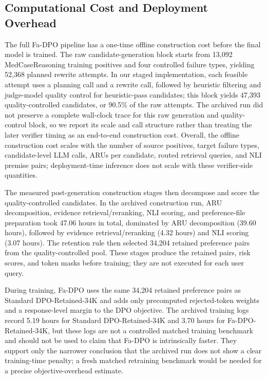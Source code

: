 \documentclass[a4paper,fleqn,doubleblind]{cas-sc}
\begin{document}
\subsection{Computational Cost and Deployment Overhead}
The full Fa-DPO pipeline has a one-time offline construction cost before the final model is trained. The raw candidate-generation block starts from 13,092 MedCaseReasoning training positives and four controlled failure types, yielding 52,368 planned rewrite attempts. In our staged implementation, each feasible attempt uses a planning call and a rewrite call, followed by heuristic filtering and judge-model quality control for heuristic-pass candidates; this block yields 47,393 quality-controlled candidates, or 90.5\% of the raw attempts. The archived run did not preserve a complete wall-clock trace for this raw generation and quality-control block, so we report its scale and call structure rather than treating the later verifier timing as an end-to-end construction cost. Overall, the offline construction cost scales with the number of source positives, target failure types, candidate-level LLM calls, ARUs per candidate, routed retrieval queries, and NLI premise pairs; deployment-time inference does not scale with these verifier-side quantities.

The measured post-generation construction stages then decompose and score the quality-controlled candidates. In the archived construction run, ARU decomposition, evidence retrieval/reranking, NLI scoring, and preference-file preparation took 47.06 hours in total, dominated by ARU decomposition (39.60 hours), followed by evidence retrieval/reranking (4.32 hours) and NLI scoring (3.07 hours). The retention rule then selected 34,204 retained preference pairs from the quality-controlled pool. These stages produce the retained pairs, risk scores, and token masks before training; they are not executed for each user query.

During training, Fa-DPO uses the same 34,204 retained preference pairs as Standard DPO-Retained-34K and adds only precomputed rejected-token weights and a response-level margin to the DPO objective. The archived training logs record 5.19 hours for Standard DPO-Retained-34K and 3.70 hours for Fa-DPO-Retained-34K, but these logs are not a controlled matched training benchmark and should not be used to claim that Fa-DPO is intrinsically faster. They support only the narrower conclusion that the archived run does not show a clear training-time penalty; a fresh matched retraining benchmark would be needed for a precise objective-overhead estimate.
\end{document}
